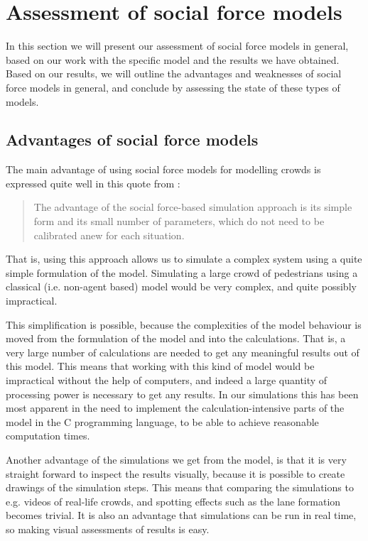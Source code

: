 \section{Assessment of social force models}
\label{sec:assessment}
In this section we will present our assessment of social force models in 
general, based on our work with the specific model and the results we have 
obtained. Based on our results, we will outline the advantages and weaknesses 
of social force models in general, and conclude by assessing the state of 
these types of models.

\subsection{Advantages of social force models}
The main advantage of using social force models for modelling crowds is 
expressed quite well in this quote from \cite{self-org}:

\begin{quote}
    The advantage of the social force-based simulation approach is its simple 
    form and its small number of parameters, which do not need to be 
    calibrated anew for each situation.
\end{quote}

That is, using this approach allows us to simulate a complex system using a 
quite simple formulation of the model. Simulating a large crowd of pedestrians 
using a classical (i.e. non-agent based) model would be very complex, and 
quite possibly impractical.

This simplification is possible, because the complexities of the model 
behaviour is moved from the formulation of the model and into the 
calculations. That is, a very large number of calculations are needed to get 
any meaningful results out of this model. This means that working with this 
kind of model would be impractical without the help of computers, and indeed a 
large quantity of processing power is necessary to get any results. In our 
simulations this has been most apparent in the need to implement the 
calculation-intensive parts of the model in the C programming language, to be 
able to achieve reasonable computation times.

Another advantage of the simulations we get from the model, is that it is very 
straight forward to inspect the results visually, because it is possible to 
create drawings of the simulation steps. This means that comparing the 
simulations to e.g. videos of real-life crowds, and spotting effects such as 
the lane formation becomes trivial. It is also an advantage that simulations 
can be run in real time, so making visual assessments of results is easy.

